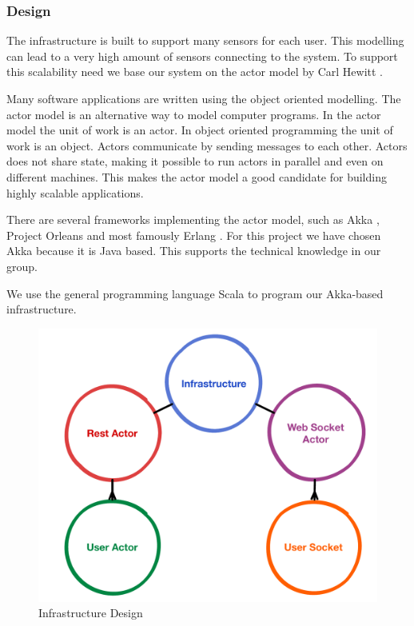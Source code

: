 \documentclass{sigchi}
\begin{document}
\subsubsection{Design}
The infrastructure is built to support many sensors for each user.
This modelling can lead to a very high amount of sensors connecting to the system.
To support this scalability need we base our system on the actor model by Carl Hewitt \cite{hewitt1973universal}.

Many software applications are written using the object oriented modelling.
The actor model is an alternative way to model computer programs.
In the actor model the unit of work is an actor.
In object oriented programming the unit of work is an object.
Actors communicate by sending messages to each other.
Actors does not share state, making it possible to run actors in parallel and even on different machines.
This makes the actor model a good candidate for building highly scalable applications.

There are several frameworks implementing the actor model, such as Akka \cite{akka}, Project Orleans \cite{orleans} and most famously Erlang \cite{erlang}.
For this project we have chosen Akka because it is Java based.
This supports the technical knowledge in our group.

We use the general programming language Scala \cite{scala} to program our Akka-based infrastructure.


\begin{figure}[H]
  \centering
  \includegraphics[width=\columnwidth]{figures/infrastructure_design.pdf}
  \caption{Infrastructure Design}
  \label{fig:infrastructure}
\end{figure}
\end{document}

